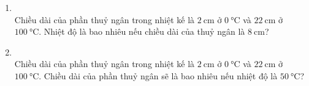\begin{enumerate}[label=\bfseries Câu \arabic*:, leftmargin=1.7cm]
\item {}\\
Chiều dài của phần thuỷ ngân trong nhiệt kế là $\SI{2}{\centi\meter}$ ở $\SI{0}{\celsius}$ và $\SI{22}{\centi\meter}$ ở $\SI{100}{\celsius}$. Nhiệt độ là bao nhiêu nếu chiều dài của thuỷ ngân là $\SI{8}{\centi\meter}$?


\item {}\\
Chiều dài của phần thuỷ ngân trong nhiệt kế là $\SI{2}{\centi\meter}$ ở $\SI{0}{\celsius}$ và $\SI{22}{\centi\meter}$ ở $\SI{100}{\celsius}$. Chiều dài của phần thuỷ ngân sẽ là bao nhiêu nếu nhiệt độ là $\SI{50}{\celsius}$?


\end{enumerate}
